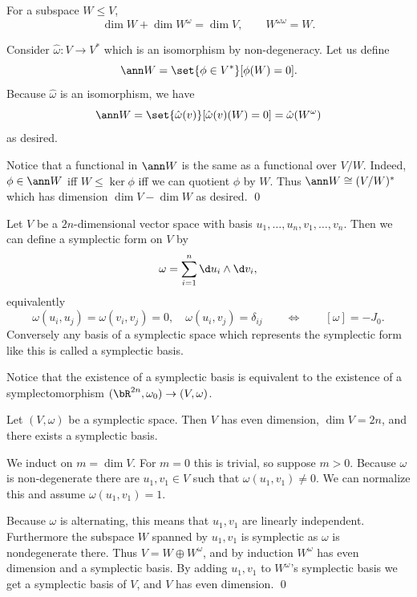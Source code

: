 \blemm

    For a subspace $W\leq V$,
    $$ \dim W + \dim W^\omega = \dim V,\qquad W^{\omega\omega} = W . $$

\elemm

\bproof

    Consider $\hat\omega\colon V\to V^*$ which is an isomorphism by non-degeneracy.
    Let us define
    $$ \ann W = \set{\phi\in V^*}[\phi(W)=0] . $$
    Because $\hat\omega$ is an isomorphism, we have
    $$ \ann W = \set{\hat\omega(v)}[\hat\omega(v)(W)=0] = \hat\omega(W^\omega) $$
    as desired.

    Notice that a functional in $\ann W$ is the same as a functional over $V/W$.
    Indeed, $\phi\in\ann W$ iff $W\leq\ker\phi$ iff we can quotient $\phi$ by $W$.
    Thus $\ann W\cong(V/W)^*$ which has dimension $\dim V-\dim W$ as desired.
    \qed

\eproof

Let $V$ be a $2n$-dimensional vector space with basis $u_1,\dots,u_n,v_1,\dots,v_n$.
Then we can define a symplectic form on $V$ by
$$ \omega = \sum_{i=1}^n\d u_i\wedge\d v_i , $$
equivalently
$$ \omega(u_i,u_j) = \omega(v_i,v_j) = 0,\quad \omega(u_i,v_j) = \delta_{ij} \qquad\iff\qquad [\omega] = -J_0 . $$
Conversely any basis of a symplectic space which represents the symplectic form like this is called a {\emphcolor symplectic basis}.

Notice that the existence of a symplectic basis is equivalent to the existence of a symplectomorphism $(\bR^{2n},\omega_0)\to(V,\omega)$.

\bthrm

    Let $(V,\omega)$ be a symplectic space.
    Then $V$ has even dimension, $\dim V=2n$, and there exists a symplectic basis.

\ethrm

\bproof

    We induct on $m=\dim V$.
    For $m=0$ this is trivial, so suppose $m>0$.
    Because $\omega$ is non-degenerate there are $u_1,v_1\in V$ such that $\omega(u_1,v_1)\neq0$.
    We can normalize this and assume $\omega(u_1,v_1)=1$.

    Because $\omega$ is alternating, this means that $u_1,v_1$ are linearly independent.
    Furthermore the subspace $W$ spanned by $u_1,v_1$ is symplectic as $\omega$ is nondegenerate there.
    Thus $V=W\oplus W^\omega$, and by induction $W^\omega$ has even dimension and a symplectic basis.
    By adding $u_1,v_1$ to $W^\omega$'s symplectic basis we get a symplectic basis of $V$, and $V$ has even dimension.
    \qed

